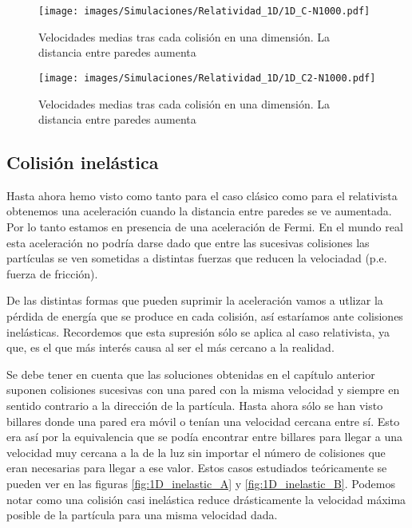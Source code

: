 \documentclass[11pt, spanish]{book}
\begin{document}
\begin{figure}[H]
    \centering
    \texttt{[image: images/Simulaciones/Relatividad\_1D/1D\_C-N1000.pdf]}
    \caption{Velocidades medias tras cada colisión en una dimensión. La distancia entre paredes aumenta}
    \label{fig:relatividad_1D_C}
\end{figure}

\begin{figure}[H]
    \centering
    \texttt{[image: images/Simulaciones/Relatividad\_1D/1D\_C2-N1000.pdf]}
    \caption{Velocidades medias tras cada colisión en una dimensión. La distancia entre paredes aumenta}
    \label{fig:relatividad_1D_C2}
\end{figure}

\subsection{Colisión inelástica}

Hasta ahora hemo visto como tanto para el caso clásico como para el relativista obtenemos una aceleración cuando la distancia entre paredes se ve aumentada. Por lo tanto estamos en presencia de una aceleración de Fermi. En el mundo real esta aceleración no podría darse dado que entre las sucesivas colisiones las partículas se ven sometidas a distintas fuerzas que reducen la velociadad (p.e. fuerza de fricción). 

\vspace{3mm}

De las distintas formas que pueden suprimir la aceleración vamos a utlizar la pérdida de energía que se produce en cada colisión, así estaríamos ante colisiones inelásticas. Recordemos que esta supresión sólo se aplica al caso relativista, ya que, es el que más interés causa al ser el más cercano a la realidad.

\vspace{3mm}

Se debe tener en cuenta que las soluciones obtenidas en el capítulo anterior suponen colisiones sucesivas con una pared con la misma velocidad y siempre en sentido contrario a la dirección de la partícula. Hasta ahora sólo se han visto billares donde una pared era móvil o tenían una velocidad cercana entre sí. Esto era así por la equivalencia que se podía encontrar entre billares para llegar a una velocidad muy cercana a la de la luz sin importar el número de colisiones que eran necesarias para llegar a ese valor. Estos casos estudiados teóricamente se pueden ver en las figuras \ref{fig:1D_inelastic_A} y \ref{fig:1D_inelastic_B}. Podemos notar como una colisión casi inelástica reduce drásticamente la velocidad máxima posible de la partícula para una misma velocidad dada.
\end{document}
